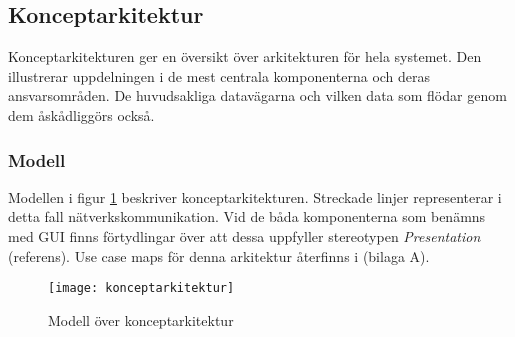 \subsection{Konceptarkitektur}
Konceptarkitekturen ger en översikt över arkitekturen för hela systemet. Den illustrerar uppdelningen i de mest centrala komponenterna och deras ansvarsområden. De huvudsakliga datavägarna och vilken data som flödar genom dem åskådliggörs också.

\subsubsection{Modell}
Modellen i figur \ref{fig:konceptarkitektur} beskriver konceptarkitekturen. Streckade linjer representerar i detta fall nätverkskommunikation. Vid de båda komponenterna som benämns med GUI finns förtydlingar över att dessa uppfyller stereotypen \textit{Presentation} (referens). Use case maps för denna arkitektur återfinns i (bilaga A).

\begin{figure}[h]
    \centering
    \texttt{[image: konceptarkitektur]}
    \caption{Modell över konceptarkitektur}
    \label{fig:konceptarkitektur}
\end{figure}

